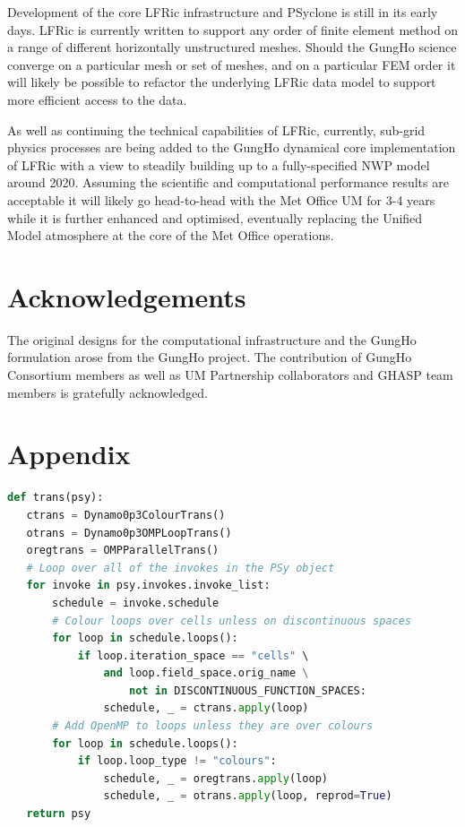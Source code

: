 \documentclass[review,times]{elsarticle}
\begin{document}
Development of the core LFRic infrastructure and PSyclone is still in
its early days. LFRic is currently written to support any order of finite
element method on a range of different horizontally unstructured meshes.
Should the GungHo science converge on a particular mesh or set of meshes,
and on a particular FEM order it will likely be possible to refactor the
underlying LFRic data model to support more efficient access to the
data.

As well as continuing the technical capabilities of LFRic, currently,
sub-grid physics processes are being added to the GungHo dynamical
core implementation of LFRic with a view to steadily building up to a
fully-specified NWP model around 2020. Assuming the scientific and
computational performance results are acceptable it will likely go
head-to-head with the Met Office UM for 3-4 years while it is further
enhanced and optimised, eventually replacing the Unified Model
atmosphere at the core of the Met Office operations.

\section*{Acknowledgements}
The original designs for the computational infrastructure and the GungHo
formulation arose from the GungHo project. The contribution of GungHo
Consortium members as well as UM Partnership collaborators and GHASP team
members is gratefully acknowledged.


\section*{\label{app1}Appendix}

\begin{lstlisting}[language=python,caption={Python script for applying
transformations to a PSyclone schedule.},label={lst:omp.py}]
def trans(psy):
   ctrans = Dynamo0p3ColourTrans()
   otrans = Dynamo0p3OMPLoopTrans()
   oregtrans = OMPParallelTrans()
   # Loop over all of the invokes in the PSy object
   for invoke in psy.invokes.invoke_list:
       schedule = invoke.schedule
       # Colour loops over cells unless on discontinuous spaces
       for loop in schedule.loops():
           if loop.iteration_space == "cells" \
               and loop.field_space.orig_name \
                   not in DISCONTINUOUS_FUNCTION_SPACES:
               schedule, _ = ctrans.apply(loop)
       # Add OpenMP to loops unless they are over colours
       for loop in schedule.loops():
           if loop.loop_type != "colours":
               schedule, _ = oregtrans.apply(loop)
               schedule, _ = otrans.apply(loop, reprod=True)
   return psy
\end{lstlisting}

\newpage


\end{document}
